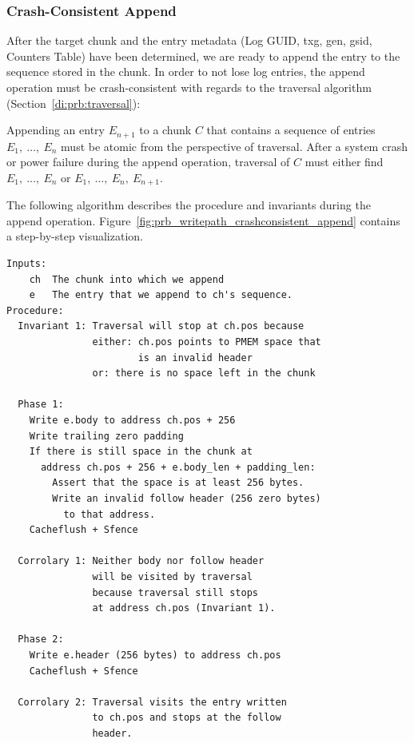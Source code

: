 \documentclass[12pt,a4paper,twoside]{book}
\begin{document}

\subsubsection{Crash-Consistent Append}\label{di:prb:write:crashconsistency}
After the target chunk and the entry metadata (Log GUID, txg, gen, gsid, Counters Table) have been determined, we are ready to append the entry to the sequence stored in the chunk.
In order to not lose log entries, the append operation must be crash-consistent with regards to the traversal algorithm (Section~\ref{di:prb:traversal}):
\begin{displayquote}
    Appending an entry $E_{n+1}$ to a chunk $C$ that contains a sequence of entries $E_1,~\dots,~E_n$ must be atomic from the perspective of traversal.
    After a system crash or power failure during the append operation, traversal of $C$ must either find $E_1,~\dots,~E_n$ or $E_1,~\dots,~E_n,~E_{n+1}$.
\end{displayquote}
The following algorithm describes the procedure and invariants during the append operation.
Figure~\ref{fig:prb_writepath_crashconsistent_append} contains a step-by-step visualization.
\begin{lstlisting}[style=figurepseudocode]
Inputs:
    ch  The chunk into which we append
    e   The entry that we append to ch's sequence.
Procedure:
  Invariant 1: Traversal will stop at ch.pos because
               either: ch.pos points to PMEM space that
                       is an invalid header
               or: there is no space left in the chunk

  Phase 1:
    Write e.body to address ch.pos + 256
    Write trailing zero padding
    If there is still space in the chunk at
      address ch.pos + 256 + e.body_len + padding_len:
        Assert that the space is at least 256 bytes.
        Write an invalid follow header (256 zero bytes)
          to that address.
    Cacheflush + Sfence

  Corrolary 1: Neither body nor follow header
               will be visited by traversal
               because traversal still stops
               at address ch.pos (Invariant 1).

  Phase 2:
    Write e.header (256 bytes) to address ch.pos
    Cacheflush + Sfence

  Corrolary 2: Traversal visits the entry written
               to ch.pos and stops at the follow
               header.
\end{lstlisting}
\end{document}
